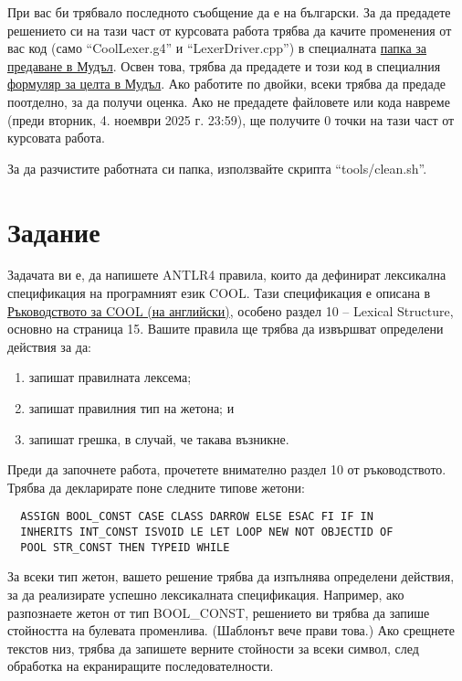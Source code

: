\documentclass[11pt]{article}
\makeatletter
\newcommand{\verbatimfont}[1]{\def\verbatim@font{#1}}%
\makeatother
\begin{document}
При вас би трябвало последното съобщение да е на български.
За да предадете решението си на тази част от курсовата работа трябва да качите променения от вас код (само ``CoolLexer.g4'' и ``LexerDriver.cpp'') в специалната \href{https://learn.fmi.uni-sofia.bg/mod/publication/view.php?id=359465}{папка за предаване в Мудъл}.
Освен това, трябва да предадете и този код в специалния \href{https://learn.fmi.uni-sofia.bg/mod/quiz/view.php?id=358624}{формуляр за целта в Мудъл}.
Ако работите по двойки, всеки трябва да предаде поотделно, за да получи оценка.
Ако не предадете файловете или кода навреме (преди вторник, 4. ноември 2025 г. 23:59), ще получите 0 точки на тази част от курсовата работа.

За да разчистите работната си папка, използвайте скрипта ``tools/clean.sh''.

\section{Задание}

Задачата ви е, да напишете ANTLR4 правила, които да дефинират лексикална спецификация на програмният език COOL.
Тази спецификация е описана в \href{https://web.stanford.edu/class/cs143/materials/cool-manual.pdf}{Ръководството за COOL (на английски)}, особено раздел 10 -- Lexical Structure, основно на страница 15.
Вашите правила ще трябва да извършват определени действия за да:

\begin{enumerate}
    \item запишат правилната лексема;
    \item запишат правилния тип на жетона; и
    \item запишат грешка, в случай, че такава възникне.
\end{enumerate}

Преди да започнете работа, прочетете внимателно раздел 10 от ръководството.
Трябва да декларирате поне следните типове жетони:

\verbatimfont{\CyrMono}
\begin{verbatim}
  ASSIGN BOOL_CONST CASE CLASS DARROW ELSE ESAC FI IF IN
  INHERITS INT_CONST ISVOID LE LET LOOP NEW NOT OBJECTID OF
  POOL STR_CONST THEN TYPEID WHILE
\end{verbatim}

За всеки тип жетон, вашето решение трябва да изпълнява определени действия, за да реализирате успешно лексикалната спецификация.
Например, ако разпознаете жетон от тип BOOL\_CONST, решението ви трябва да запише стойността на булевата променлива.
(Шаблонът вече прави това.)
Ако срещнете текстов низ, трябва да запишете верните стойности за всеки символ, след обработка на екраниращите последователности.
\end{document}

